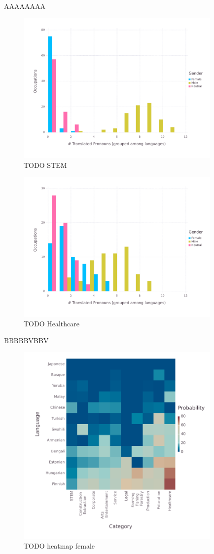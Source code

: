 \documentclass[fleqn,10pt]{article}
\begin{document}
AAAAAAAA

\begin{figure}[H]
	\centering
	\includegraphics[width=10cm]{pictures/histograms/categories/gender-dodged-STEM}
	\caption{TODO STEM}
	\label{fig:histogram-dodged-STEM}
\end{figure}

\begin{figure}[H]
	\centering
	\includegraphics[width=10cm]{pictures/histograms/categories/gender-dodged-Healthcare}
	\caption{TODO Healthcare}
	\label{fig:histogram-dodged-Healthcare}
\end{figure}

BBBBBVBBV

\begin{figure}[H]
	\centering
	\includegraphics[width=10cm]{pictures/heatmap-languages-categories-Female}
	\caption{TODO heatmap female}
	\label{fig:heatmap-female}
\end{figure}
\end{document}
